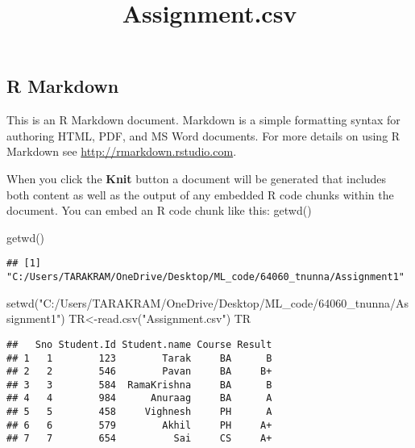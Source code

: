 \documentclass[
]{article}
\title{Assignment.csv}
\author{}
\date{\vspace{-2.5em}}
\newenvironment{Shaded}{\begin{snugshade}}{\end{snugshade}}
\newcommand{\FunctionTok}[1]{\textcolor[rgb]{0.00,0.00,0.00}{#1}}
\newcommand{\NormalTok}[1]{#1}
\newcommand{\OtherTok}[1]{\textcolor[rgb]{0.56,0.35,0.01}{#1}}
\newcommand{\SpecialCharTok}[1]{\textcolor[rgb]{0.00,0.00,0.00}{#1}}
\newcommand{\StringTok}[1]{\textcolor[rgb]{0.31,0.60,0.02}{#1}}
\begin{document}
\maketitle

\hypertarget{r-markdown}{%
\subsection{R Markdown}\label{r-markdown}}

This is an R Markdown document. Markdown is a simple formatting syntax
for authoring HTML, PDF, and MS Word documents. For more details on
using R Markdown see \url{http://rmarkdown.rstudio.com}.

When you click the \textbf{Knit} button a document will be generated
that includes both content as well as the output of any embedded R code
chunks within the document. You can embed an R code chunk like this:
getwd()

\begin{Shaded}
\begin{Highlighting}[]
\FunctionTok{getwd}\NormalTok{()}
\end{Highlighting}
\end{Shaded}

\begin{verbatim}
## [1] "C:/Users/TARAKRAM/OneDrive/Desktop/ML_code/64060_tnunna/Assignment1"
\end{verbatim}

\begin{Shaded}
\begin{Highlighting}[]
\FunctionTok{setwd}\NormalTok{(}\StringTok{"C:/Users/TARAKRAM/OneDrive/Desktop/ML\_code/64060\_tnunna/Assignment1"}\NormalTok{)}
\NormalTok{TR}\OtherTok{\textless{}{-}}\FunctionTok{read.csv}\NormalTok{(}\StringTok{"Assignment.csv"}\NormalTok{)}
\NormalTok{TR}
\end{Highlighting}
\end{Shaded}

\begin{verbatim}
##   Sno Student.Id Student.name Course Result
## 1   1        123        Tarak     BA      B
## 2   2        546        Pavan     BA     B+
## 3   3        584  RamaKrishna     BA      B
## 4   4        984      Anuraag     BA      A
## 5   5        458     Vighnesh     PH      A
## 6   6        579        Akhil     PH     A+
## 7   7        654          Sai     CS     A+
\end{verbatim}

\begin{Shaded}
\end{Shaded}
\end{document}
